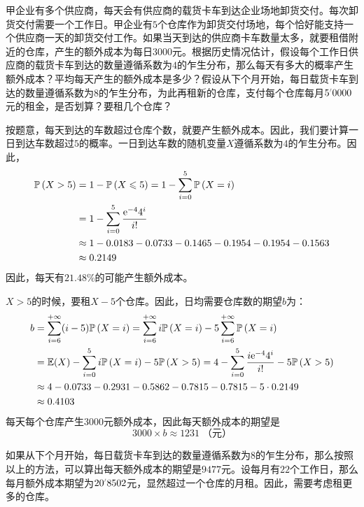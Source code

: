 \documentclass[12pt,UTF8,fontset=none]{ctexbook}
\begin{document}
\begin{et}
    甲企业有多个供应商，每天会有供应商的载货卡车到达企业场地卸货交付。每次卸货交付需要一个工作日。甲企业有$5$个仓库作为卸货交付场地，每个恰好能支持一个供应商一天的卸货交付工作。如果当天到达的供应商卡车数量太多，就要租借附近的仓库，产生的额外成本为每日$3000$元。根据历史情况估计，假设每个工作日供应商的载货卡车到达的数量遵循系数为$4$的乍生分布，那么每天有多大的概率产生额外成本？平均每天产生的额外成本是多少？假设从下个月开始，每日载货卡车到达的数量遵循系数为$8$的乍生分布，为此再租新的仓库，支付每个仓库每月$5\dlim{0000}$元的租金，是否划算？要租几个仓库？
\end{et}

\begin{so}
    按题意，每天到达的车数超过仓库个数，就要产生额外成本。因此，我们要计算一日到达车数超过$5$的概率。一日到达车数的随机变量$X$遵循系数为$4$的乍生分布。因此，
    \begin{align*}
        \mathbb{P}\left(X>5\right) &= 1 - \mathbb{P}\left(X \leqslant 5\right)= 1 - \sum_{i=0}^5 \mathbb{P}\left(X = i\right) \\
        &= 1 - \sum_{i=0}^{5} \frac{\mathrm{e}^{-4}4^i}{i!} \\
        &\approx 1 - 0.0183 - 0.0733 - 0.1465 - 0.1954 - 0.1954 - 0.1563 \\
        &\approx 0.2149
    \end{align*}
    因此，每天有$21.48\%$的可能产生额外成本。

    $X>5$的时候，要租$X-5$个仓库。因此，日均需要仓库数的期望$b$为：
    \begin{align*}
        b&= \sum_{i=6}^{+\infty} (i - 5)\mathbb{P}\left(X = i\right) = \sum_{i=6}^{+\infty} i\mathbb{P}\left(X = i\right) - 5 \sum_{i=6}^{+\infty} \mathbb{P}\left(X = i\right) \\
        &= \mathbb{E}(X) - \sum_{i=0}^{5} i\mathbb{P}\left(X = i\right) - 5 \mathbb{P}\left(X>5\right) = 4 - \sum_{i=0}^{5} \frac{i\mathrm{e}^{-4}4^i}{i!} - 5 \mathbb{P}\left(X>5\right) \\
        &\approx 4 - 0.0733 - 0.2931 - 0.5862 - 0.7815 - 0.7815 - 5\cdot 0.2149 \\
        &\approx 0.4103 
    \end{align*}
    每天每个仓库产生$3000$元额外成本，因此每天额外成本的期望是
    $$3000 \times b \approx 1231\; \mbox{（元）}$$

    如果从下个月开始，每日载货卡车到达的数量遵循系数为$8$的乍生分布，那么按照以上的方法，可以算出每天额外成本的期望是$9477$元。设每月有$22$个工作日，那么每月额外成本期望为$20\dlim{8502}$元，显然超过一个仓库的月租。因此，需要考虑租更多的仓库。


\end{so}
\end{document}
